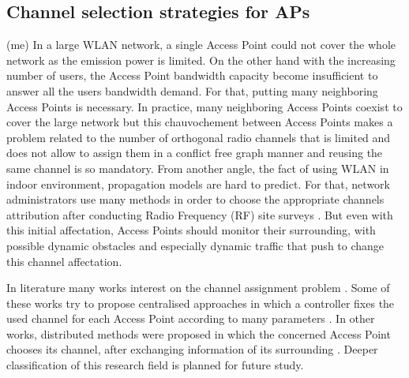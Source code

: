 \documentclass[journal,transmag]{IEEEtran}
\begin{document}
\subsection{Channel selection strategies for APs} (me)
In a large WLAN network, a single Access Point could not cover the whole network as the emission power is limited. On the other hand with the increasing number of users, the Access Point bandwidth capacity become insufficient to answer all the users bandwidth demand. For that, putting many neighboring Access Points is necessary. In practice, many neighboring Access Points coexist to cover the large network but this chauvochement between Access Points makes a problem related to the number of orthogonal radio channels that is limited and does not allow to assign them in a conflict free graph manner \cite{15channel_selection_dynamics_dense_wifi} and reusing the same channel is so mandatory. 
From another angle, the fact of using WLAN in indoor environment, propagation models are hard to predict. For that, network administrators use many methods in order to choose the appropriate channels attribution after conducting Radio Frequency (RF) site surveys \cite{06client_channel_WLAN}. But even with this initial affectation, Access Points should monitor their surrounding, with possible dynamic obstacles and especially dynamic traffic that push to change this channel affectation. 

In literature many works interest on the channel assignment problem \cite{15COAP,13outsourcing_AP_cloud_API,11PIE_sky,16SDN_based_channel_assignement,16centralised_wifi_manegement,15channel_selection_dynamics_dense_wifi,05weighted_coloring_channel_assignement_WLAN,05frequancy_allocation_graph_coloring,06self_managed_distributed_channel_selection,07Traffic_channel_assignment_WLAN,07distributed_channel_assignement_multiradio_mesh,14channel_selection_regression,16CCI_queuing_model,15WI_FM,09adjacent_channel_interference_allocation,08channel_assignement_SIR_WLAN,13adaptive_proportional_fairness}. Some of these works try to propose centralised approaches in which a controller fixes the used channel for each Access Point according to many parameters \cite{15COAP,13outsourcing_AP_cloud_API,11PIE_sky,16SDN_based_channel_assignement,16centralised_wifi_manegement,15channel_selection_dynamics_dense_wifi}. In other works, distributed methods were proposed in which the concerned Access Point chooses its channel, after exchanging information of its surrounding \cite{05weighted_coloring_channel_assignement_WLAN,05frequancy_allocation_graph_coloring,06self_managed_distributed_channel_selection,07Traffic_channel_assignment_WLAN,07distributed_channel_assignement_multiradio_mesh,14channel_selection_regression}. Deeper classification of this research field is planned for future study. 
\end{document}
